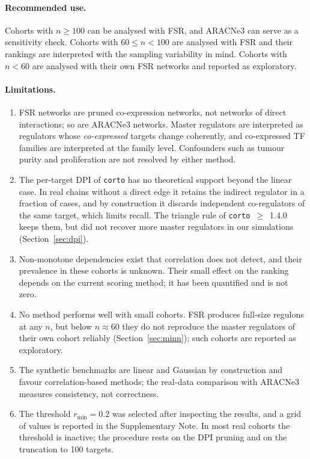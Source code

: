 \documentclass[11pt,a4paper]{article}
\theoremstyle{plain}
\theoremstyle{remark}
\newcommand{\FSR}{FSR}
\begin{document}
\paragraph{Recommended use.} Cohorts with $n\ge100$ can be analysed with \FSR{}, and ARACNe3 can serve as a sensitivity check. Cohorts with $60\le n<100$ are analysed with
\FSR{} and their rankings are interpreted with the sampling variability in mind. Cohorts with $n<60$ are analysed with their own \FSR{} networks and reported as exploratory.

\paragraph{Limitations.}
\begin{enumerate}
  \item \FSR{} networks are pruned co-expression networks, not networks of direct interactions;
  so are ARACNe3 networks. Master regulators are interpreted as regulators whose
  \emph{co-expressed} targets change coherently, and co-expressed TF families are interpreted at
  the family level. Confounders such as tumour purity and proliferation are not resolved by either method.
  \item The per-target DPI of \texttt{corto} has no theoretical support beyond the linear case.
  In real chains without a direct edge it retains the indirect regulator in a fraction
  \ATworealfracabeatsbnodirect{} of cases, and by
  construction it discards independent co-regulators of the same target, which limits recall. The triangle rule of
  \texttt{corto}~$\ge$~1.4.0 keeps them, but did not recover more master regulators in our simulations (Section~\ref{sec:dpi}).
  \item Non-monotone dependencies exist that correlation does not detect, and their prevalence
  in these cohorts is unknown. Their small effect on the ranking depends on the current scoring
  method; it has been quantified and is not zero.
  \item No method performs well with small cohorts. \FSR{} produces full-size regulons at any
  $n$, but below $n\approx60$ they do not reproduce the master regulators of their own cohort
  reliably (Section~\ref{sec:minn}); such cohorts are reported as exploratory.
  \item The synthetic benchmarks are linear and Gaussian by construction and favour correlation-based methods; the real-data comparison with ARACNe3 measures
  consistency, not correctness.
  \item The threshold $r_{\min}=0.2$ was selected after inspecting the results, and a grid of
  values is reported in the Supplementary Note. In most real cohorts the threshold is inactive;
  the procedure rests on the DPI pruning and on the truncation to 100 targets.
\end{enumerate}
\end{document}
